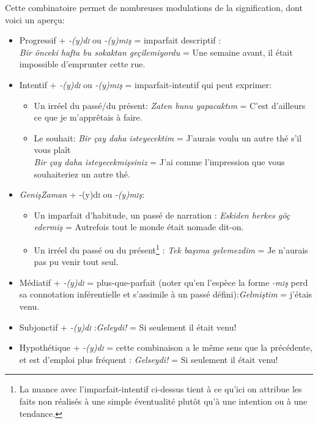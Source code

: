 \documentclass{cours}
\newcommand{\ch}{\c{s}}
\newcommand{\sci}{\textsc{i}}
\begin{document}
Cette combinatoire permet de nombreuses modulations de la signification, dont voici un aperçu: 
\begin{itemize}
    \item Progressif + \textsl{-(y)d\sci} ou \textsl{-(y)m\sci \ch} = imparfait descriptif :\\
    \textsl{Bir önceki hafta bu sokaktan geçilemiyordu} = Une semaine avant, il était impossible d'emprunter cette rue.
    \item Intentif + {\sl -(y)d\sci} ou {\sl -(y)m\sci \ch} = imparfait-intentif qui peut exprimer:
    \begin{itemize}
        \item Un irréel du passé/du présent: \textsl{Zaten bunu yapacakt\i m} = C'est d'ailleurs ce que je m'apprêtais à faire.
        \item Le souhait: \textsl{Bir çay daha isteyecektim} = J'aurais voulu un autre thé s'il vous plaît \\
        \textsl{Bir çay daha isteyecekmi\ch siniz} = J'ai comme l'impression que vous souhaiteriez un autre thé.
    \end{itemize}
    \item \textsl{Geni\ch Zaman} + {-(y)d\sci} ou {\sl -(y)m\sci \ch}: 
    \begin{itemize}
        \item Un imparfait d'habitude, un passé de narration : \textsl{Eskiden herkes göç edermi\ch} = Autrefois tout le monde était nomade dit-on.
        \item Un irréel du passé ou du présent\footnote{La nuance avec l'imparfait-intentif ci-dessus tient à ce qu'ici on attribue les faits non réalisés à une simple éventualité plutôt qu'à une intention ou à une tendance.} : \textsl{Tek ba\ch\i ma gelemezdim} = Je n'aurais pas pu venir tout seul.
    \end{itemize}
    \item Médiatif + {\sl -(y)d\sci} = plus-que-parfait (noter qu'en l'espèce la forme \textsl{-m\sci \ch} perd sa connotation inférentielle et s'assimile à un passé défini):\textsl{Gelmi\ch tim} = j'étais venu. 
    \item Subjonctif + {\sl -(y)d\sci} :\textsl{Geleydi!} = Si seulement il était venu!
    \item Hypothétique + {\sl -(y)d\sci} = cette combinaison a le même sens que la précédente, et est d'emploi plus fréquent : \textsl{Gelseydi!} = Si seulement il était venu!
\end{itemize}
\end{document}
